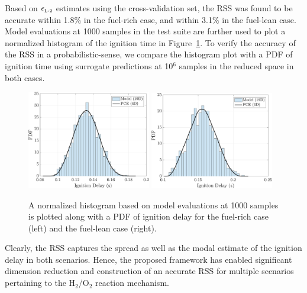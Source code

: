 Based on $\epsilon_{\mbox{\tiny{L-2}}}$ estimates using the 
cross-validation set, the RSS was found to be accurate within 1.8$\%$ in the
fuel-rich case, and
within 3.1$\%$ in the fuel-lean case. Model evaluations at 1000 samples in the test suite
are further used to plot a normalized histogram of the ignition time in 
Figure~\ref{fig:pdf_kinetics}. To verify the accuracy of the RSS in a 
probabilistic-sense, we compare the histogram plot with a PDF of ignition time
using surrogate predictions at 10$^{6}$ samples in the reduced space in both cases. 
%
\begin{figure}[htbp]
 \begin{center}
  \includegraphics[width=0.48\textwidth]{./Figures/pdf_comp_rich}
  \includegraphics[width=0.48\textwidth]{./Figures/pdf_comp_lean}
\caption{A normalized histogram based on model evaluations at 1000 samples is plotted
along with a PDF of ignition delay for the fuel-rich case (left) and the fuel-lean
case (right).}
\label{fig:pdf_kinetics}
\end{center}
\end{figure}
%
Clearly, the RSS captures the spread as well as the modal estimate of
the ignition delay in both scenarios. Hence, the proposed framework 
has enabled significant dimension reduction and construction of an accurate
RSS for multiple scenarios pertaining to the H$_2$/O$_2$ reaction
mechanism.    
